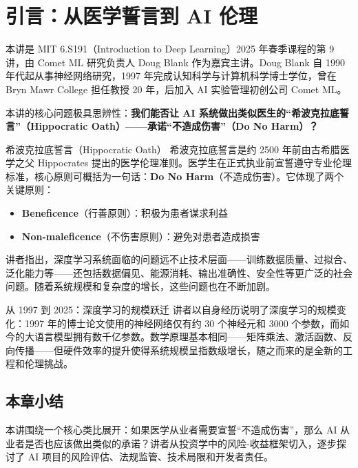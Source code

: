 \section{引言：从医学誓言到 AI 伦理}

本讲是 MIT 6.S191（Introduction to Deep Learning）2025 年春季课程的第 9 讲，由 Comet ML 研究负责人 Doug Blank 作为嘉宾主讲。Doug Blank 自 1990 年代起从事神经网络研究，1997 年完成认知科学与计算机科学博士学位，曾在 Bryn Mawr College 担任教授 20 年，后加入 AI 实验管理初创公司 Comet ML。

本讲的核心问题极具思辨性：\textbf{我们能否让 AI 系统做出类似医生的``希波克拉底誓言''（Hippocratic Oath）——承诺``不造成伤害''（Do No Harm）？}

\begin{importantbox}{希波克拉底誓言（Hippocratic Oath）}
希波克拉底誓言是约 2500 年前由古希腊医学之父 Hippocrates 提出的医学伦理准则。医学生在正式执业前宣誓遵守专业伦理标准，核心原则可概括为一句话：\textbf{Do No Harm}（不造成伤害）。它体现了两个关键原则：
\begin{itemize}
    \item \textbf{Beneficence}（行善原则）：积极为患者谋求利益
    \item \textbf{Non-maleficence}（不伤害原则）：避免对患者造成损害
\end{itemize}
\end{importantbox}

讲者指出，深度学习系统面临的问题远不止技术层面——训练数据质量、过拟合、泛化能力等——还包括数据偏见、能源消耗、输出准确性、安全性等更广泛的社会问题。随着系统规模和复杂度的增长，这些问题也在不断加剧。

\begin{knowledgebox}{从 1997 到 2025：深度学习的规模跃迁}
讲者以自身经历说明了深度学习的规模变化：1997 年的博士论文使用的神经网络仅有约 30 个神经元和 3000 个参数，而如今的大语言模型拥有数千亿参数。数学原理基本相同——矩阵乘法、激活函数、反向传播——但硬件效率的提升使得系统规模呈指数级增长，随之而来的是全新的工程和伦理挑战。
\end{knowledgebox}

\subsection{本章小结}

本讲围绕一个核心类比展开：如果医学从业者需要宣誓``不造成伤害''，那么 AI 从业者是否也应该做出类似的承诺？讲者从投资学中的风险-收益框架切入，逐步探讨了 AI 项目的风险评估、法规监管、技术局限和开发者责任。

